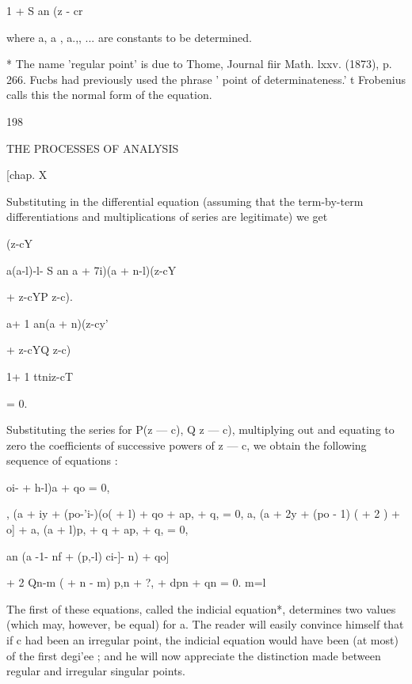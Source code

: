 1 + S an (z - cr



where a, a , a.,, ... are constants to be determined.

* The name 'regular point' is due to Thome, Journal fiir Math. lxxv.
(1873), p. 266. Fucbs had previously used the phrase ' point of
determinateness.' t Frobenius calls this the normal form of the
equation.



198



THE PROCESSES OF ANALYSIS



[chap. X



Substituting in the differential equation (assuming that the
term-by-term differentiations and multiplications of series are
legitimate) we get



(z-cY



a(a-l)-l- S an a + 7i)(a + n-l)(z-cY



+ z-cYP z-c).



a+ 1 an(a + n)(z-cy'



+ z-cYQ z-c)



1+ 1 ttniz-cT



= 0.



Substituting the series for P(z — c), Q z — c), multiplying out and
equating to zero the coefficients of successive powers of z — c, we
obtain the following sequence of equations :

oi- + h-l)a + qo = 0,

 , (a + iy + (po-'i-)(o( + l) + qo + ap, + q, = 0, a, (a + 2y + (po -
1) ( + 2 ) + o] + a, (a + l)p, + q + ap, + q, = 0,

an (a -1- nf + (p,-l) ci-]- n) + qo]

+ 2 Qn-m ( + n - m) p,n + ?, + dpn + qn = 0. m=l

The first of these equations, called the indicial equation*,
determines two values (which may, however, be equal) for a. The reader
will easily convince himself that if c had been an irregular point,
the indicial equation would have been (at most) of the first degi'ee ;
and he will now appreciate the distinction made between regular and
irregular singular points.

